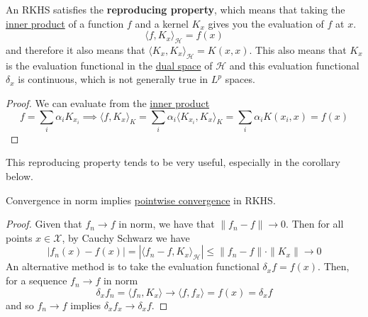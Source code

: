   \begin{theorem}
    \label{thm:reproducing-property-of-rkhs}
    An RKHS satisfies the \textbf{reproducing property}, which means that taking the \hyperref[lin-def:inner-product]{inner product} of a function $f$ and a kernel $K_x$ gives you the evaluation of $f$ at $x$. 
    \begin{equation}
      \langle f, K_x \rangle_{\mathcal{H}} = f(x)
    \end{equation}
    and therefore it also means that $\langle K_x, K_x \rangle_{\mathcal{H}} = K(x, x)$. This also means that $K_x$ is the evaluation functional in the \hyperref[lin-def:dual-space]{dual space} of $\mathcal{H}$ and this evaluation functional $\delta_x$ is continuous, which is not generally true in $L^p$ spaces. 
  \end{theorem}
  \begin{proof}
    We can evaluate from the \hyperref[lin-def:inner-product]{inner product} 
    \begin{equation}
      f = \sum_i \alpha_i K_{x_i} \implies \langle f, K_x \rangle_K = \sum_i \alpha_i \langle K_{x_i}, K_x \rangle_K = \sum_i \alpha_i K(x_i, x) = f(x)
    \end{equation}
  \end{proof}

  This reproducing property tends to be very useful, especially in the corollary below. 

  \begin{corollary}
    \label{thm:convergence-in-rkhs}
    Convergence in norm implies \hyperref[real-def:pointwise-convergence]{pointwise convergence} in RKHS. 
  \end{corollary}
  \begin{proof}
    Given that $f_n \rightarrow f$ in norm, we have that $\|f_n - f\| \rightarrow 0$. Then for all points $x \in \mathcal{X}$, by Cauchy Schwarz we have 
    \begin{equation}
      |f_n(x) - f(x)| = |\langle f_n - f, K_x \rangle_{\mathcal{H}}| \leq \|f_n - f\| \cdot \|K_x\| \rightarrow 0
    \end{equation}
    An alternative method is to take the evaluation functional $\delta_x f = f(x)$. Then, for a sequence $f_n \to f$ in norm
    \begin{equation}
      \delta_x f_n = \langle f_n, K_x \rangle \to \langle f, f_x \rangle = f(x) = \delta_x f
    \end{equation}
    and so $f_n \to f$ implies $\delta_x f_x \to \delta_x f$. 
  \end{proof}

